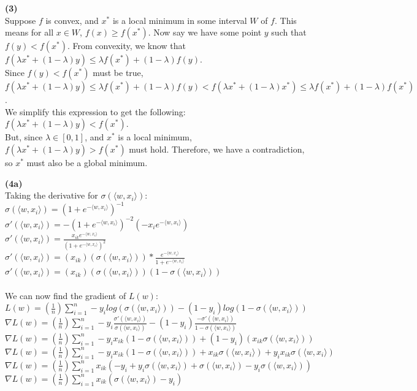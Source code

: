 \documentclass[12pt, letterpaper]{article}
\begin{document}
\newpage
\noindent \large{\textbf{(3)} } \\
Suppose $f$ is convex, and $x^*$ is a local minimum in some interval $W$ of $f$. This means for all $x \in W$, $f(x)\geq f(x^*)$. Now say we have some point $y$ such that $f(y)<f(x^*)$. From convexity, we know that\\
 $f(\lambda x^*+(1-\lambda )y) \leq \lambda f(x^*)+(1-\lambda )f(y)$. \\
Since $f(y)<f(x^*)$ must be true, \\
$f(\lambda x^*+(1-\lambda )y) \leq \lambda f(x^*)+(1-\lambda )f(y) < f(\lambda x^*+(1-\lambda )x^*) \leq \lambda f(x^*)+(1-\lambda )f(x^*)$.\\
We simplify this expression to get the following:\\
$f(\lambda x^* +(1-\lambda )y) < f(x^*)$.\\
But, since $\lambda \in [0,1]$, and $x^*$ is a local minimum,  $f(\lambda x^*+(1-\lambda )y) > f(x^*)$ must hold. Therefore, we have a contradiction, so $x^*$ must also be a global minimum.

\newpage
\noindent \large{\textbf{(4a)} } \\
Taking the derivative for $\sigma(\langle w,x_i \rangle )$:\\
$\sigma(\langle w,x_i \rangle )=(1+e^{-\langle w,x_i\rangle})^{-1}$\\
$\sigma '(\langle w,x_i \rangle )=-(1+e^{-\langle w,x_i\rangle})^{-2}(-x_i e^{-\langle w,x_i\rangle})$\\
$\sigma '(\langle w,x_i \rangle )=\frac{x_{ik} e^{-\langle w,x_i\rangle}}{(1+e^{-\langle w,x_i\rangle})^{2}}$\\
$\sigma '(\langle w,x_i \rangle )=(x_{ik})(\sigma(\langle w,x_i \rangle )) * \frac{e^{-\langle w,x_i\rangle}}{1+e^{-\langle w,x_i\rangle}}$\\
$\sigma '(\langle w,x_i \rangle )=(x_{ik})(\sigma(\langle w,x_i \rangle ))(1-\sigma(\langle w,x_i \rangle ))$\\
\\
We can now find the gradient of $L(w)$:\\
$L(w)=(\frac{1}{n})\sum_{i=1}^{n}-y_i log(\sigma(\langle w,x_i \rangle )) - (1-y_i)log(1-\sigma(\langle w,x_i\rangle))$\\
$\nabla L(w)=(\frac{1}{n})\sum_{i=1}^{n}-y_i \frac{\sigma '(\langle w,x_i \rangle )}{\sigma(\langle w,x_i \rangle )} - (1-y_i)\frac{-\sigma '(\langle w,x_i \rangle )}{1-\sigma(\langle w,x_i \rangle )}$\\
$\nabla L(w)=(\frac{1}{n})\sum_{i=1}^{n}-y_ix_{ik}(1-\sigma(\langle w,x_i \rangle ) )+(1-y_i)(x_{ik}\sigma(\langle w,x_i \rangle ))$\\
$\nabla L(w)=(\frac{1}{n})\sum_{i=1}^{n}-y_ix_{ik}(1-\sigma(\langle w,x_i \rangle ) )+x_{ik}\sigma(\langle w,x_i \rangle ) +y_ix_{ik}\sigma(\langle w,x_i \rangle )$\\
$\nabla L(w)=(\frac{1}{n})\sum_{i=1}^{n}x_{ik}(-y_i+y_i\sigma(\langle w,x_i \rangle ) +\sigma(\langle w,x_i \rangle ) -y_i\sigma(\langle w,x_i \rangle ))$\\
$\nabla L(w)=(\frac{1}{n})\sum_{i=1}^{n}x_{ik}(\sigma(\langle w,x_i \rangle ) - y_i)$\\
\end{document}
